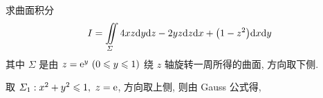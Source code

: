 \begin{example}
    求曲面积分 $$I=\iint\limits_\varSigma 4xz\dd y\dd z-2yz\dd z\dd x+\qty(1-z^2)\dd x\dd y$$
    其中 $\varSigma$ 是由 $z=\mathrm{e} ^y~ (0\leqslant y\leqslant 1)$ 绕 $z$ 轴旋转一周所得的曲面, 方向取下侧.
\end{example}
\begin{solution}
    取 $\varSigma_1:x^2+y^2\leqslant 1,~z=\mathrm{e} $, 方向取上侧, 则由 Gauss 公式得,
\end{solution}



